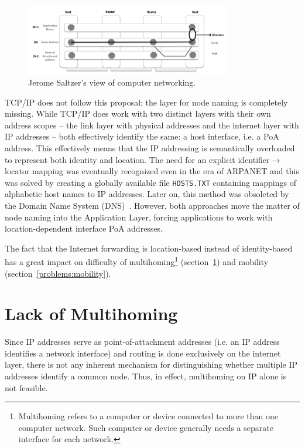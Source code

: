         \begin{figure}[H]
            \begin{center}
                \includegraphics[width=0.8\textwidth]{fig/problems_saltzer.png}
              \caption{Jerome Saltzer's view of computer networking.}
              \label{fig:saltzer}
            \end{center}
        \end{figure}

        TCP/IP does not follow this proposal: the layer for node naming is completely missing. While TCP/IP does work with two distinct layers with their own address scopes -- the link layer with physical addresses and the internet layer with IP addresses -- both effectively identify the same: a host interface, i.e. a PoA address. This effectively means that the IP addressing is semantically overloaded to represent both identity and location. The need for an explicit identifier$\rightarrow$locator mapping was eventually recognized even in the era of ARPANET and this was solved by creating a globally available file \texttt{HOSTS.TXT} containing mappings of alphabetic host names to IP addresses. Later on, this method was obsoleted by the Domain Name System (DNS)~\cite{rfc1034}. However, both approaches move the matter of node naming into the Application Layer, forcing applications to work with location-dependent interface PoA addresses.

        The fact that the Internet forwarding is location-based instead of identity-based has a great impact on difficulty of multihoming\footnote{Multihoming refers to a computer or device connected to more than one computer network. Such computer or device generally needs a separate interface for each network.} (section~\ref{problems:multihoming}) and mobility (section~\ref{problems:mobility}).

    \section{Lack of Multihoming}\label{problems:multihoming}

        Since IP addresses serve as point-of-attachment addresses (i.e. an IP address identifies a network interface) and routing is done exclusively on the internet layer, there is not any inherent mechanism for distinguishing whether multiple IP addresses identify a common node. Thus, in effect, multihoming on IP alone is not feasible.

